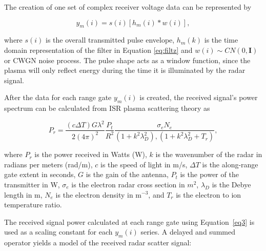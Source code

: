 \documentclass[draft,ras]{agutex}
\begin{document}
\begin{article}
The creation of one set of complex receiver voltage data can be represented by

\begin{equation}
\label{eq2}
y_m (i)= s(i)\left[h_m(i)*w(i)\right],
\end{equation}
 
\noindent where $s(i)$ is the overall transmitted pulse envelope, $h_m(k)$ is the time domain representation of the filter in Equation \ref{eq:filtz} and $w(i)\sim CN(0,\mathbf{I})$ or CWGN noise process. The pulse shape acts as a window function, since the plasma will only reflect energy during the time it is illuminated by the radar signal. 

%


After the data for each range gate $y_m(i)$ is created, the received signal's power spectrum can be calculated from ISR plasma scattering theory as 

\begin{equation}
\label{eq3}
P_r = \frac{\left(c\Delta T\right) G \lambda^2}{2(4\pi)^2}\frac{P_t }{R^2}\frac{\sigma_e N_e}{(1+k^2\lambda_D^2),(1+k^2\lambda_D^2 + T_r)},
\end{equation}
 
 \noindent where $P_r$ is the power received in Watts (W), $k$ is the wavenumber of the radar in radians per meters (rad/m), $c$ is the speed of light in m/s, $\Delta T$ is the along-range gate extent in seconds, $G$ is the gain of the antenna, $P_t$ is the power of the transmitter in W, $\sigma_e$ is the electron radar cross section in $m^2$,  $\lambda_D$ is the Debye length in m, $N_e$ is the electron density in m$^{-3}$, and $T_r$ is the electron to ion temperature ratio.
  
The received signal power calculated at each range gate using Equation~\ref{eq3} is used as a scaling constant for each $y_m(i)$ series.  A delayed and summed operator yields a model of the received radar scatter signal:
 

\end{article}
\end{document}
